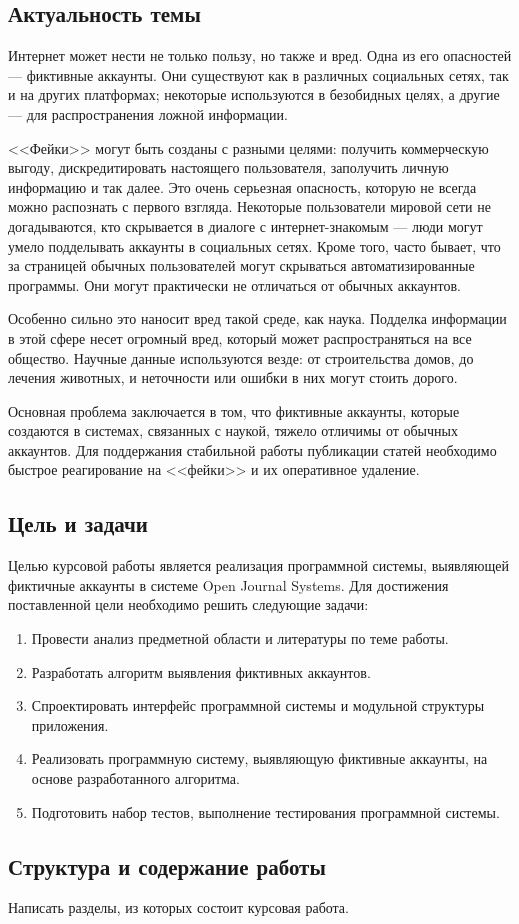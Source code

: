\newpage
{}

\subsection*{Актуальность темы}
Интернет может нести не только пользу, но также и вред. Одна из его опасностей — фиктивные аккаунты. Они существуют как в различных социальных сетях, так и на других платформах; некоторые используются в безобидных целях, а другие — для распространения ложной информации.

<<Фейки>> могут быть созданы с разными целями: получить коммерческую выгоду, дискредитировать настоящего пользователя, заполучить личную информацию и так далее. Это очень серьезная опасность, которую не всегда можно распознать с первого взгляда. Некоторые пользователи мировой сети не догадываются, кто скрывается в диалоге с интернет-знакомым — люди могут умело подделывать аккаунты в социальных сетях. Кроме того, часто бывает, что за страницей обычных пользователей могут скрываться автоматизированные программы. Они могут практически не отличаться от обычных аккаунтов.

Особенно сильно это наносит вред такой среде, как наука. Подделка информации в этой сфере несет огромный вред, который может распространяться на все общество. Научные данные используются везде: от строительства домов, до лечения животных, и неточности или ошибки в них могут стоить дорого. 

Основная проблема заключается в том, что фиктивные аккаунты, которые создаются в системах, связанных с наукой, тяжело отличимы от обычных аккаунтов. Для поддержания стабильной работы публикации статей необходимо быстрое реагирование на <<фейки>> и их оперативное удаление. 

\subsection*{Цель и задачи}
Целью курсовой работы является реализация программной системы, выявляющей фиктичные аккаунты в системе Open Journal Systems. Для достижения поставленной цели необходимо решить следующие задачи:
\begin{enumerate}
	\item Провести анализ предметной области и литературы по теме работы.
	\item Разработать алгоритм выявления фиктивных аккаунтов.
	\item Спроектировать интерфейс программной системы и модульной структуры приложения.
	\item Реализовать программную систему, выявляющую фиктивные аккаунты, на основе разработанного алгоритма.
        \item Подготовить набор тестов, выполнение тестирования программной системы.
\end{enumerate}

\subsection*{Структура и содержание работы}
Написать разделы, из которых состоит курсовая работа.